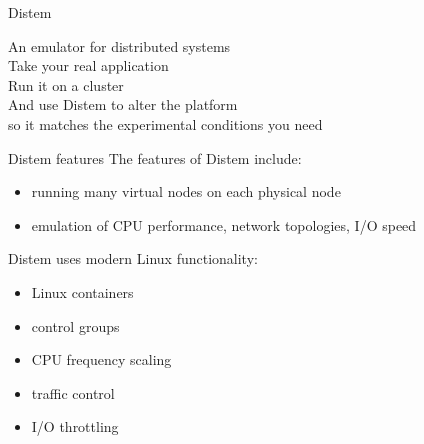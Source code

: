 \documentclass[11pt,xcolor=dvipsnames,presentation]{beamer}
\begin{document}
\begin{frame}[label=sec-2-0-1]{Distem}
\begin{center}
\huge
An emulator for distributed systems\\[0.5em]
\large
Take your \alert{real application}\\[0.5em]
Run it on a \alert{cluster}\\[0.5em]
And use \alert{Distem} to \alert{alter the platform}\\
so it \alert{matches the experimental conditions you need}\\[1em]
\normalsize
{}
\end{center}
\end{frame}

\begin{frame}[label=sec-2-0-2]{Distem features}
The features of Distem include:

\begin{itemize}
\item running many virtual nodes on each physical node
\item emulation of CPU performance, network topologies, I/O speed
\end{itemize}

Distem uses modern Linux functionality:

\begin{itemize}
\item Linux containers
\item control groups
\item CPU frequency scaling
\item traffic control
\item I/O throttling
\end{itemize}
\end{frame}
\end{document}
